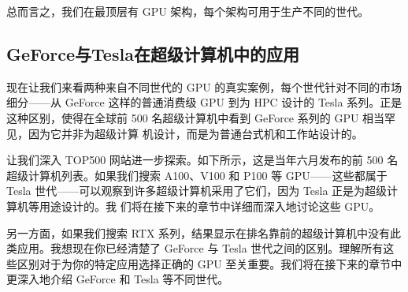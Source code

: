 总而言之，我们在最顶层有 GPU 架构，每个架构可用于生产不同的世代。


\subsection{GeForce与Tesla在超级计算机中的应用}

现在让我们来看两种来自不同世代的 GPU 的真实案例，每个世代针对不同的市场细分——从 GeForce 这样的普通消费级 GPU 到为 HPC
设计的 Tesla 系列。正是这种区别，使得在全球前 500 名超级计算机中看到 GeForce 系列的 GPU 相当罕见，因为它并非为超级计算
机设计，而是为普通台式机和工作站设计的。

让我们深入 TOP500 网站进一步探索。如下所示，这是当年六月发布的前 500 名超级计算机列表。如果我们搜索 A100、V100 和
P100 等 GPU——这些都属于 Tesla 世代——可以观察到许多超级计算机采用了它们，因为 Tesla 正是为超级计算机等用途设计的。我
们将在接下来的章节中详细而深入地讨论这些 GPU。

另一方面，如果我们搜索 RTX 系列，结果显示在排名靠前的超级计算机中没有此类应用。我想现在你已经清楚了 GeForce 与 Tesla 
世代之间的区别。理解所有这些区别对于为你的特定应用选择正确的 GPU 至关重要。我们将在接下来的章节中更深入地介绍 GeForce 
和 Tesla 等不同世代。
